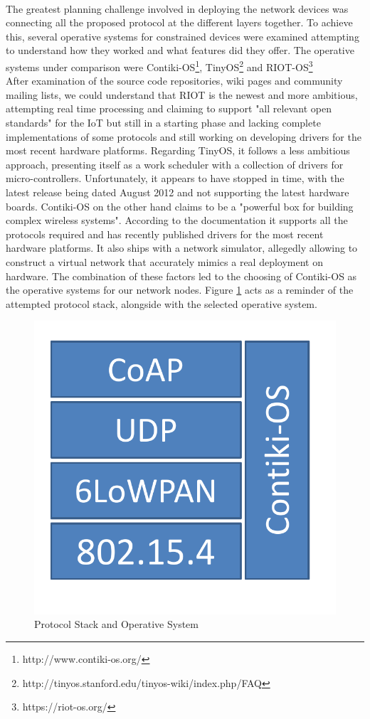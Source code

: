 \paragraph{}
The greatest planning challenge involved in deploying the network devices was connecting all the proposed protocol at the different layers together. To achieve this, several operative systems for constrained devices were examined attempting to understand how they worked and what features did they offer. The operative systems under comparison were Contiki-OS\footnote{http://www.contiki-os.org/}, TinyOS\footnote{http://tinyos.stanford.edu/tinyos-wiki/index.php/FAQ} and RIOT-OS\footnote{https://riot-os.org/}\\
After examination of the source code repositories, wiki pages and community mailing lists, we could understand that RIOT is the newest and more ambitious, attempting real time processing and claiming to support "all relevant open standards" for the \gls{IoT} but still in a starting phase and lacking complete implementations of some protocols and still working on developing drivers for the most recent hardware platforms. Regarding TinyOS, it follows a less ambitious approach, presenting itself as a work scheduler with a collection of drivers for micro-controllers. Unfortunately, it appears to have stopped in time, with the latest release being dated August 2012 and not supporting the latest hardware boards. Contiki-OS on the other hand claims to be a "powerful box for building complex wireless systems". According to the documentation it supports all the protocols required and has recently published drivers for the most recent hardware platforms. It also ships with a network simulator, allegedly allowing to construct a virtual network that accurately mimics a real deployment on hardware. The combination of these factors led to the choosing of Contiki-OS as the operative systems for our network nodes. Figure \ref{fig:stack_operative_system} acts as a reminder of the attempted protocol stack, alongside with the selected operative system.\\

\begin{figure}[h]
  \centering
  \includegraphics[width=0.3\linewidth]{figures/Stack.pdf}
  \caption{Protocol Stack and Operative System}
  \label{fig:stack_operative_system}
\end{figure}

